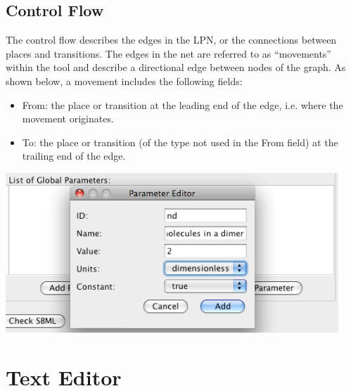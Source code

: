 \documentclass[titlepage,11pt]{article}
\begin{document}
\subsection{\label{controlFlow}Control Flow}

\noindent
The control flow describes the edges in the LPN, or the connections between
places and transitions.  The edges in the net are referred to as ``movements''
within the tool and describe a directional edge between nodes of the graph.
As shown below, a movement includes the following fields:
\begin{itemize}
\item From: the place or transition at the leading end of the edge, i.e. where
       the movement originates.
\item To: the place or transition  (of the type not used in the From field) at
       the trailing end of the edge.
\end{itemize}
\begin{center}
\includegraphics[height=60mm]{screenshots/parameter}
\end{center}

\section{\label{TextEdit}Text Editor}
\end{document}
